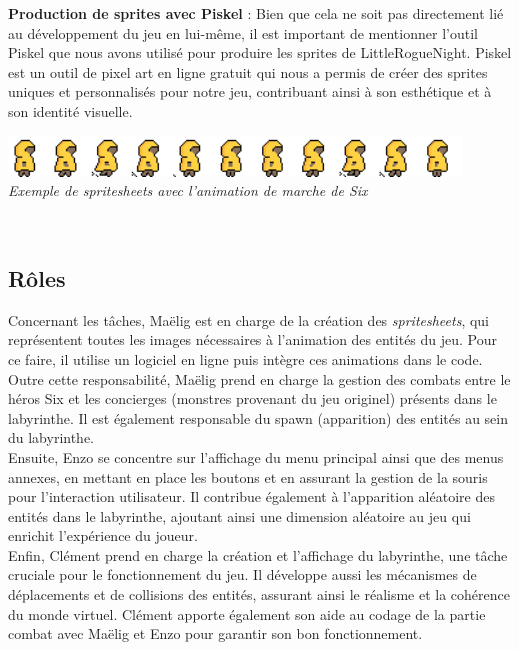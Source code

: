 \documentclass[10pt]{article}
\begin{document}
\textbf{Production de sprites avec Piskel} :
Bien que cela ne soit pas directement lié au développement du jeu en lui-même, il est important de mentionner l'outil Piskel que nous avons utilisé pour produire les sprites de LittleRogueNight. Piskel est un outil de pixel art en ligne gratuit qui nous a permis de créer des sprites uniques et personnalisés pour notre jeu, contribuant ainsi à son esthétique et à son identité visuelle.\\
\begin{center}
\includegraphics[width=12cm]{six_run.png}\\
\caption{{\emph{Exemple de spritesheets avec l'animation de marche de Six}}}
\label{fig7}\\
\end{center}

\subsection{Rôles}
Concernant les tâches, Maëlig est en charge de la création des \textit{\gls{spritesheets}}, qui représentent toutes les images nécessaires à l'animation des entités du jeu. Pour ce faire, il utilise un logiciel en ligne puis intègre ces animations dans le code. Outre cette responsabilité, Maëlig prend en charge la gestion des combats entre le héros Six et les concierges (monstres provenant du jeu originel) présents dans le labyrinthe. Il est également responsable du \gls{spawn} (apparition) des entités au sein du labyrinthe.\\

Ensuite, Enzo se concentre sur l'affichage du menu principal ainsi que des menus annexes, en mettant en place les boutons et en assurant la gestion de la souris pour l'interaction utilisateur. Il contribue également à l'apparition aléatoire des entités dans le labyrinthe, ajoutant ainsi une dimension aléatoire au jeu qui enrichit l'expérience du joueur.\\

Enfin, Clément prend en charge la création et l'affichage du labyrinthe, une tâche cruciale pour le fonctionnement du jeu. Il développe aussi les mécanismes de déplacements et de collisions des entités, assurant ainsi le réalisme et la cohérence du monde virtuel. Clément apporte également son aide au codage de la partie combat avec Maëlig et Enzo pour garantir son bon fonctionnement. 
\end{document}
